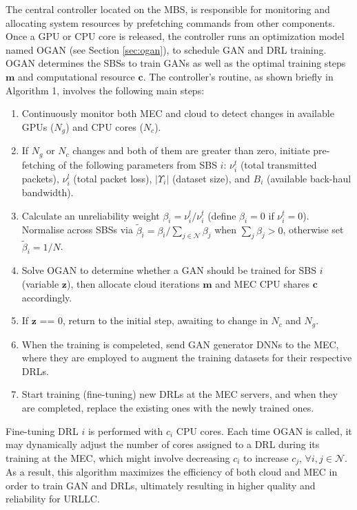 \documentclass[letterpaper%
, twoside%
, 12pt%
,memoire%
, english%
,creativecommons,hyperref, withAlgo2e %
]{thETS}
\numberwithin{algorithm}{chapter}
\begin{document}


 The central controller located on the MBS, is responsible for monitoring and allocating system resources by prefetching commands from other components. Once a GPU or CPU core is released, the controller runs an optimization model named OGAN (see Section \ref{sec:ogan}), to schedule GAN and DRL training. OGAN determines the SBSs to train GANs as well as the optimal training steps $\mathbf{m}$ and computational resource $\mathbf{c}$. The controller's routine, as shown briefly in Algorithm 1, involves the following main steps:

\begin{enumerate}

    \item Continuously monitor both MEC and cloud to detect changes in available GPUs ($N_g$) and CPU cores ($N_c$). 
    \item If $N_g$ or $N_c$ changes and both of them are greater than zero, initiate pre-fetching of the following parameters from SBS $i$: $\nu_i^t$ (total transmitted packets), $\nu_i^l$ (total packet loss), $|\Upsilon_i|$ (dataset size), and $B_i$ (available back-haul bandwidth).
    \item Calculate an unreliability weight $\beta_i = \nu_i^l/\nu_i^t$ (define $\beta_i=0$ if $\nu_i^t=0$). Normalise across SBSs via $\tilde{\beta}_i=\beta_i/\sum_{j\in\mathcal{N}}\beta_j$ when $\sum_j\beta_j>0$, otherwise set $\tilde{\beta}_i=1/N$.
    \item  Solve OGAN to determine whether a GAN should be trained for SBS $i$ (variable $\mathbf{z}$), then allocate cloud iterations $\mathbf{m}$ and MEC CPU shares $\mathbf{c}$ accordingly.
    
    \item If $\mathbf{z}$ == 0, return to the initial step, awaiting to change in $N_c$ and $N_g$.
    
    \item When the training is compeleted, send GAN generator DNNs to the MEC, where they are employed to augment the training datasets for their respective DRLs.
    
    \item Start training (fine-tuning) new DRLs at the MEC servers, and when they are completed, replace the existing ones with the newly trained ones.

\end{enumerate}

 Fine-tuning DRL $i$ is performed with $c_{i}$ CPU cores. Each time OGAN is called, it may dynamically adjust the number of cores assigned to a DRL during its training at the MEC, which might involve decreasing $c_i$ to increase $c_j$,  $\forall i,j \in \mathcal{N}$. As a result, this algorithm maximizes the efficiency of both cloud and MEC in order to train GAN and DRLs, ultimately resulting in higher quality and reliability for URLLC.  
\end{document}
